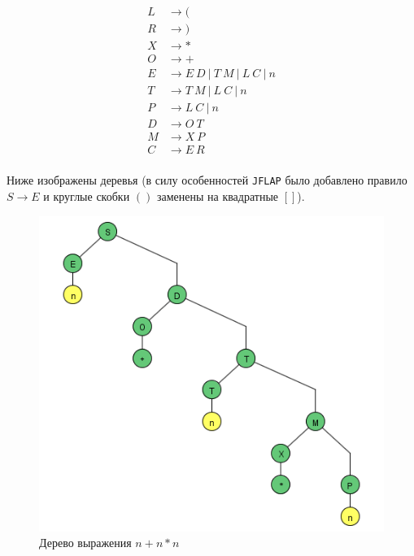 \begin{solution}
	\begin{align*}
		L &\rightarrow (\\
		R &\rightarrow )\\
		X &\rightarrow *\\
		O &\rightarrow +\\
		E &\rightarrow E\ D\ |\ T\ M\ |\ L\ C\ |\ n\\
		T &\rightarrow T\ M\ |\ L\ C\ |\ n \\
		P &\rightarrow L\ C\ |\ n\\
		D &\rightarrow O\ T\\
		M &\rightarrow X\ P\\
		C &\rightarrow E\ R\\
	\end{align*}
\end{solution}

Ниже изображены деревья (в силу особенностей \texttt{JFLAP} было добавлено правило $S \rightarrow E$ и круглые скобки $()$ заменены на квадратные $[]$).

\begin{figure}[ht!]
\centering
\includegraphics[scale=0.5]{t1.png}
\caption{Дерево выражения $n+n*n$}
\end{figure}

